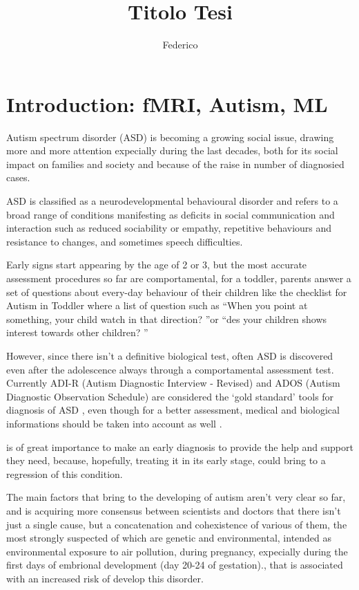 \documentclass[a4paper,11pt]{article}
\title{Titolo Tesi}
\author{Federico}
\begin{document}
\maketitle
\tableofcontents

\section{Introduction: fMRI, Autism, ML}
Autism spectrum disorder (ASD) is becoming a growing social issue, drawing more and more attention expecially during the last decades, both for its social impact on families and society and because of the raise in number of diagnosied cases.

ASD is classified as a neurodevelopmental behavioural disorder \cite{guze-1995} \cite{who-1993} and refers to a broad range of conditions manifesting as deficits in social communication and interaction such as reduced sociability or empathy, repetitive behaviours and resistance to changes, and sometimes speech difficulties.\cite{rapin-2008}


Early signs start appearing by the age of 2 or 3, but the most accurate assessment procedures so far are comportamental, for a toddler, parents answer a set of questions about every-day behaviour of their children like the checklist for Autism in Toddler \cite{robins-2009} where a list of question such as \textquotedblleft When you point at something, your child watch in that direction? \textquotedblright or \textquotedblleft des your children shows interest towards other children? \textquotedblright

However, since there isn't a definitive biological test, often ASD is discovered even after the adolescence always through a comportamental assessment test.
Currently ADI-R (Autism Diagnostic Interview - Revised) and ADOS (Autism Diagnostic Observation Schedule) are considered the ‘gold standard’ tools for diagnosis of ASD \cite{ozonoff-2015} \cite{lecouteur-2008}, even though for a better assessment, medical and biological informations should be taken into account as well .

is of great importance to make an early diagnosis to provide the help and support they need, because, hopefully, treating it in its early stage, could bring to a regression of this condition.

The main factors that bring to the developing of autism aren't very clear so far, and is acquiring more consensus between scientists and doctors that there isn't just a single cause, but a concatenation and cohexistence of various of them, the most strongly suspected of which are genetic and environmental, intended as environmental exposure to air pollution,
during pregnancy, expecially during the first days of embrional development (day 20-24 of gestation).\cite{ratajczak-2011}, that is associated with an increased risk of develop this disorder.
\end{document}
